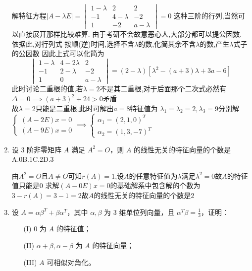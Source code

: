 \documentclass[12pt, a4paper, oneside, UTF8]{ctexbook}
\begin{document}
\begin{enumerate}
    \begin{solution}[转圈化简]
    解特征方程$\left|A-\lambda E\right| = \begin{vmatrix}
        1-\lambda & 2 & 2 \\
        -1 & 4-\lambda & -2 \\
        1 & -2 & a-\lambda 
    \end{vmatrix} = 0$
    这种三阶的行列,当然可以直接展开那样比较难算. 由于考研不会故意恶心人,大部分都可以提公因数. 依据此,对行列式
    按顺(逆)时间,选择{\color{red}不含$\lambda$的数,化简其余不含$\lambda$的数,产生$\lambda$式子的公因数} 
    因此上式可以化简为 
    $$
    \begin{vmatrix}
        1-\lambda & 4 - 2\lambda & 2 \\
        -1 & 2-\lambda & -2 \\
        1 & 0 & a-\lambda 
    \end{vmatrix} = (2-\lambda)\left[\lambda^2-(a+3)\lambda+3a-6\right]
    $$
    此时讨论二重根的值,若$\lambda=2$不是其二重根,对于后面那个二次式必然有$\Delta=0\implies (a+3)^2+24>0$矛盾\\
    故$\lambda=2$只能是二重根,此时可解出$a=8$特征值为
    $\lambda_1=\lambda_2=2,\lambda_3=9$分别解$\begin{cases}
        (A-2E)x = 0 \\
        (A-9E)x = 0 
    \end{cases}\implies \begin{cases}
        \alpha_1 = (2,1,0)^T \\
        \alpha_2 = (1,3,-7)^T
    \end{cases}$
    \end{solution}
    

    \item 设 3 阶非零矩阵 $A$ 满足 $A^2 = O$，则 $A$ 的线性无关的特征向量的个数是 \\
    A.0\qquad B.1\qquad C.2\qquad D.3
    
    \begin{solution}
    由$A^2=O$且$A\neq O$可知$r(A)=1$,设$A$的任意特征值为$\lambda$满足$\lambda^2=0$故$A$的特征值只能是$0$
    求解$(A-0E)x=0$的基础解系中包含解的个数为$3-r(A)=3-1=2$故$A$的线性无关的特征向量的个数是2
    \end{solution}
    
    \item 设 $A = \alpha \beta^T + \beta \alpha^T$，其中 $\alpha, \beta$ 为 3 维单位列向量，且 $\alpha^T \beta = \frac{1}{3}$，证明：
    \begin{enumerate}
        \item [(I)] 0 为 $A$ 的特征值；
        \item [(II)] $\alpha + \beta, \alpha - \beta$ 为 $A$ 的特征向量；
        \item [(III)] $A$ 可相似对角化。
    \end{enumerate}
    
    \begin{solution}
    \newpage
    \end{solution}
\end{enumerate}
\end{document}
